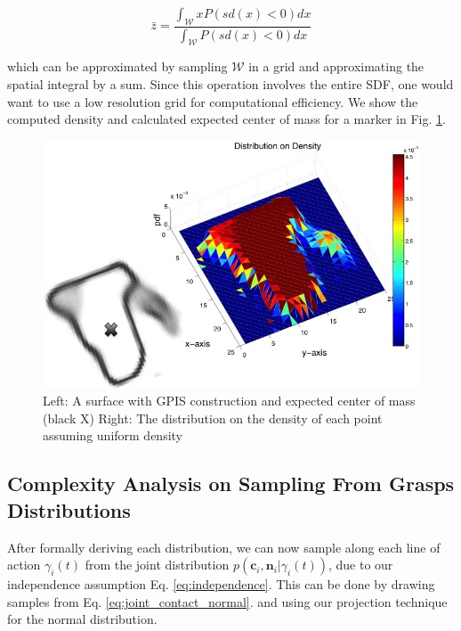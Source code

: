 \documentclass[letterpaper, 10 pt, conference]{ieeeconf}  %
\begin{document}
\begin{equation}
  \bar{z} 
  =
  \frac
    {\int_{\mathcal{W}}x P(sd(x)<0) dx}
    {\int_{\mathcal{W}}  P(sd(x)<0) dx}
\end{equation}

which can be approximated by sampling $\mathcal{W}$ in a grid and approximating the spatial integral by a sum. Since this operation involves the entire SDF, one would want to use a low resolution grid for computational efficiency. We show the computed density and calculated expected center of mass for a marker in Fig. \ref{fig:GPIS_MASS}.


\begin{figure}[ht!]
\centering
\includegraphics[scale = 0.3]{figures/Slide06.jpg}
\caption{ \footnotesize Left: A surface with GPIS construction and expected center of mass (black X)
Right: The distribution on the density of each point assuming uniform density}
\vspace*{-10pt}
\label{fig:GPIS_MASS}
\end{figure}

\subsection{Complexity Analysis on Sampling From Grasps Distributions}

After formally deriving each distribution,  we can now sample along each line of action $\gamma_i(t)$ from the joint distribution $p(\textbf{c}_i,\textbf{n}_i | \gamma_i(t))$, due to our independence assumption Eq. \ref{eq:independence}. This can be done by drawing samples from Eq. \ref{eq:joint_contact_normal}. and using our projection technique for the normal distribution. 
\end{document}
